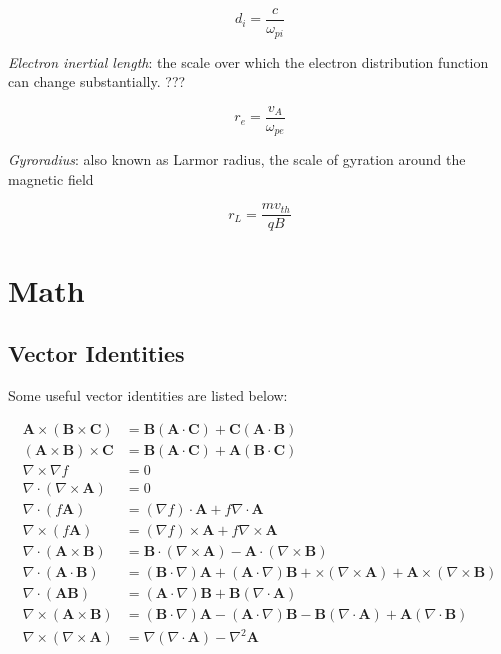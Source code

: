 \documentclass[
  notoc %
]{tufte-book}
\begin{document}
\[
d_i = \frac{c}{\omega_{pi}}
\]

\emph{Electron inertial length}: the scale over which the electron
distribution function can change substantially. ???

\[
r_e = \frac{v_A}{\omega_{pe}}
\]

\emph{Gyroradius}: also known as Larmor radius, the scale of gyration
around the magnetic field

\[
r_L = \frac{mv_{th}}{qB}
\]

\hypertarget{sec:math}{%
\chapter{Math}\label{sec:math}}

\hypertarget{vector-identities}{%
\section{Vector Identities}\label{vector-identities}}

Some useful vector identities are listed below:

\[
\begin{aligned}
\mathbf{A}\times(\mathbf{B}\times\mathbf{C}) &= \mathbf{B}(\mathbf{A}\cdot\mathbf{C}) + \mathbf{C}(\mathbf{A}\cdot\mathbf{B}) \\
(\mathbf{A}\times\mathbf{B})\times\mathbf{C} &= \mathbf{B}(\mathbf{A}\cdot\mathbf{C}) + \mathbf{A}(\mathbf{B}\cdot\mathbf{C}) \\
\nabla\times\nabla f &= 0 \\
\nabla\cdot(\nabla\times\mathbf{A}) &= 0 \\
\nabla\cdot(f\mathbf{A}) &= (\nabla f)\cdot\mathbf{A} + f\nabla\cdot\mathbf{A} \\
\nabla\times(f\mathbf{A}) &= (\nabla f)\times\mathbf{A} + f\nabla\times\mathbf{A} \\
\nabla\cdot(\mathbf{A}\times\mathbf{B}) &= \mathbf{B}\cdot(\nabla\times\mathbf{A}) - \mathbf{A}\cdot(\nabla\times\mathbf{B}) \\
\nabla\cdot(\mathbf{A}\cdot\mathbf{B}) &= (\mathbf{B}\cdot\nabla)\mathbf{A} + (\mathbf{A}\cdot\nabla)\mathbf{B} + \mathbf\times(\nabla\times\mathbf{A}) + \mathbf{A}\times(\nabla\times\mathbf{B}) \\
\nabla\cdot(\mathbf{A}\mathbf{B}) &= (\mathbf{A}\cdot\nabla)\mathbf{B} + \mathbf{B}(\nabla\cdot\mathbf{A}) \\
\nabla\times(\mathbf{A}\times\mathbf{B}) &= (\mathbf{B}\cdot\nabla)\mathbf{A} - (\mathbf{A}\cdot\nabla)\mathbf{B} - \mathbf{B}(\nabla\cdot\mathbf{A}) + \mathbf{A}(\nabla\cdot\mathbf{B}) \\
\nabla\times(\nabla\times\mathbf{A}) &= \nabla(\nabla\cdot\mathbf{A}) - \nabla^2\mathbf{A}
\end{aligned}
\]
\end{document}
